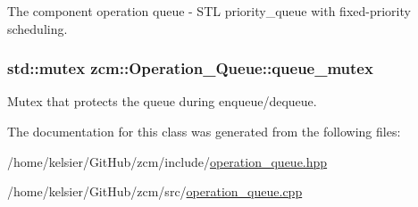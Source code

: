 The component operation queue -\/ S\-T\-L priority\-\_\-queue with fixed-\/priority scheduling. 

\hypertarget{classzcm_1_1Operation__Queue_a2203c4541451d68bbf3f5dfc7efe8449}{
\subsubsection[{queue\-\_\-mutex}]{\setlength{\rightskip}{0pt plus 5cm}std\-::mutex zcm\-::\-Operation\-\_\-\-Queue\-::queue\-\_\-mutex\hspace{0.3cm}{\ttfamily [private]}}}\label{classzcm_1_1Operation__Queue_a2203c4541451d68bbf3f5dfc7efe8449}


Mutex that protects the queue during enqueue/dequeue. 



The documentation for this class was generated from the following files\-:\begin{DoxyCompactItemize}
\item 
/home/kelsier/\-Git\-Hub/zcm/include/\hyperlink{operation__queue_8hpp}{operation\-\_\-queue.\-hpp}\item 
/home/kelsier/\-Git\-Hub/zcm/src/\hyperlink{operation__queue_8cpp}{operation\-\_\-queue.\-cpp}\end{DoxyCompactItemize}
